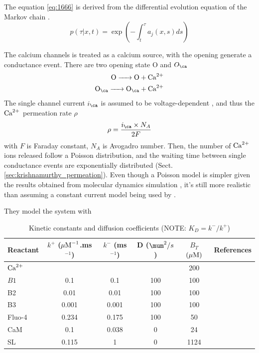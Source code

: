 \begin{framed}
The equation \ref{eq:1666} is derived from the differential evolution equation
of the Markov chain \citep{norris1997}.
\begin{equation}
p(\tau|x,t) = \exp \left( - \int_t^\tau a_j(x,s) ds \right)
\end{equation}
\end{framed}


The calcium channels is treated as a calcium source, with the opening generate a
conductance event. There are two opening state O and $O_\ca$
\begin{equation}
\begin{split}
\ce{O -> O + Ca^2+} \\
\ce{O}_\ca \ce{-> O}_\ca + \Ca
\end{split}
\end{equation}
The single channel current $i_\ca$ is assumed to be voltage-dependent
\citep{jafri1998cad}, and thus the ${\text{Ca}^{2+}}$ permeation rate $\rho$
\begin{equation}
\rho = \frac{i_\ca \times N_A}{2F}
\end{equation}
with $F$ is Faraday constant, $N_A$ is Avogadro number. Then, the number of
${\text{Ca}^{2+}}$ ions released follow a Poisson distribution, and the waiting time between
single conductance events are exponentially distributed
\citep{krishnamurthy2007} (Sect.\ref{sec:krishnamurthy_permeation}). Even though
a Poisson model is simpler given the results obtained from molecular dynamics simulation  \citep{kuyucak2001}, it's
still more realistic than assuming a constant current  model being used by
\citep{keller2008}.

 They model the system with
\begin{table}[hbt]
\begin{center}
    \begin{tabular}{lccccc}
        \hline
        Reactant & $k^+$ (${\mu\text{M}}^{-1}$.ms$^{-1}$) &  $k^-$ (ms$^{-1}$) & D
        ($\mum^2/s$) & $B_T$ $({\mu\text{M}})$ & References        \\
        \hline \hline
        ${\text{Ca}^{2+}}$ & & & & 200 & \\        
		$B1$ & 0.1 & 0.1 & 100 & 100 & \\
        B2 & 0.01 & 0.01 & 100 & 100 &\\
        B3 & 0.001 & 0.001 & 100 & 100 & \\
        Fluo-4 & 0.234 & 0.175 & 100 & 50 & \citep{uttenweiler2002} \\
        CaM & 0.1 & 0.038 & 0 & 24 & \citep{smith1998} \\
        SL & 0.115 & 1  & 0 & 1124 & \citep{smith1998}
    \end{tabular}
\end{center}
\caption{Kinetic constants and diffusion coefficients (NOTE: $K_D=k^-/k^+$)}
\label{tab:wegner_2009_param}
\end{table}

